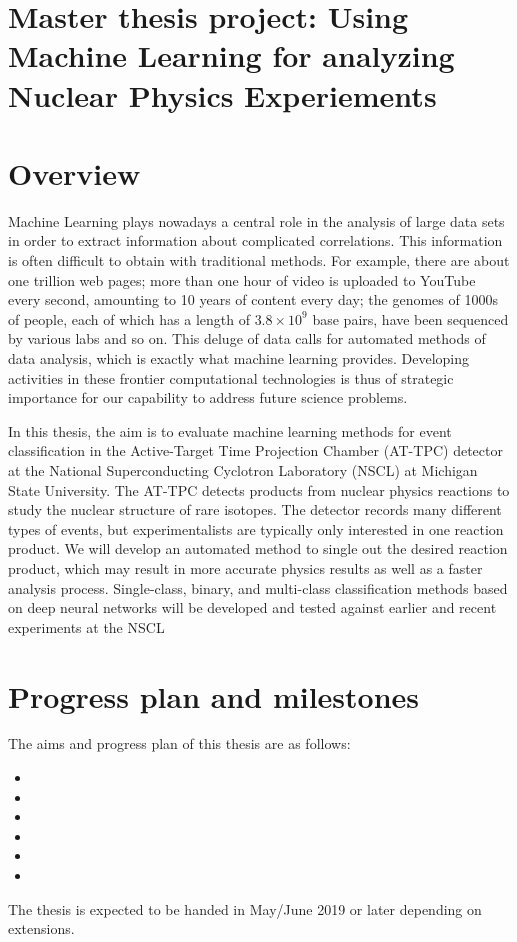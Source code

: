 \documentclass[10pt]{article}
\begin{document}
\section*{Master thesis project: Using Machine Learning for analyzing Nuclear Physics Experiements}

\section*{Overview}


Machine Learning plays nowadays a central role
in the analysis of large data sets in order to extract information
about complicated correlations. This information is often difficult to
obtain with traditional methods. For example, there are about one
trillion web pages; more than one hour of video is uploaded to YouTube
every second, amounting to 10 years of content every day; the genomes
of 1000s of people, each of which has a length of $3.8\times 10^9$
base pairs, have been sequenced by various labs and so on. This deluge
of data calls for automated methods of data analysis, which is exactly
what machine learning provides.  Developing activities in these
frontier computational technologies is thus of strategic importance
for our capability to address future science problems.

In this thesis, the aim is to evaluate machine learning methods for
event classification in the Active-Target Time Projection Chamber
(AT-TPC) detector at the National Superconducting Cyclotron Laboratory
(NSCL) at Michigan State University. The AT-TPC detects products from
nuclear physics reactions to study the nuclear structure of rare
isotopes. The detector records many different types of events, but
experimentalists are typically only interested in one reaction
product. We will develop an automated method to single out the desired reaction
product, which may  result in more accurate physics results as well as a
faster analysis process. Single-class, binary, and multi-class
classification methods based on deep neural networks will be developed and tested against earlier and recent experiments at the NSCL

\section*{Progress plan and milestones}
The aims and progress plan of this thesis are as follows:
\begin{itemize}
\item 
\item 
\item 
\item 
\item 
\item 
\end{itemize}
 
The thesis is expected to be handed in May/June 2019 or later depending on extensions.
\end{document}
